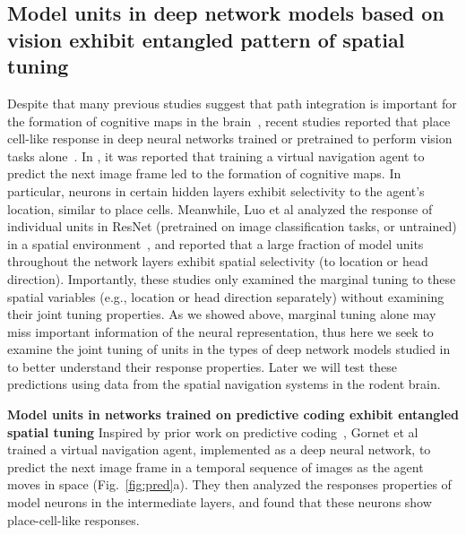 \documentclass[11pt]{article}
\begin{document}

\subsection{Model units in deep network models based on vision exhibit entangled pattern of spatial tuning}

Despite that many previous studies suggest that path integration is important for the formation of cognitive maps in the brain~\cite{Mcnaughton2006,Burak2009,Cueva2018}, recent studies reported that place cell-like response in deep neural networks trained or pretrained to perform vision tasks alone~\cite{Luo2024,Gornet2024automated}. In \cite{Gornet2024automated}, it was reported that training a virtual navigation agent to predict the next image frame led to the formation of cognitive maps. In particular, neurons in certain hidden layers exhibit selectivity to the agent's location, similar to place cells. Meanwhile, Luo et al analyzed the response of individual units in ResNet (pretrained on image classification tasks, or untrained) in a spatial environment~\cite{Luo2024}, and reported that a large fraction of model units throughout the network layers exhibit spatial selectivity (to location or head direction).  Importantly, these studies \cite{Luo2024,Gornet2024automated} only examined the marginal tuning to these spatial variables (e.g., location or head direction separately) without examining their joint tuning properties. %
As we showed above, marginal tuning alone may miss important information of the neural representation, thus here we
seek to examine the joint tuning of units in the types of deep network models studied in \cite{Luo2024,Gornet2024automated} to better understand their response properties. Later we will test these predictions using data from the spatial navigation systems in the rodent brain. 


{\bf Model units in networks trained on predictive coding exhibit entangled spatial tuning}
Inspired by prior work on predictive coding~\cite{Srinivasan1982predictive,Rao1999predictive}, Gornet et al \cite{Gornet2024automated} trained a virtual navigation agent, implemented as a deep neural network, to predict the next image frame in a temporal sequence of images as the agent moves in space (Fig.~\ref{fig:pred}a). They then analyzed the responses properties of model neurons in the intermediate layers, and found that these neurons show place-cell-like responses. 
\end{document}
